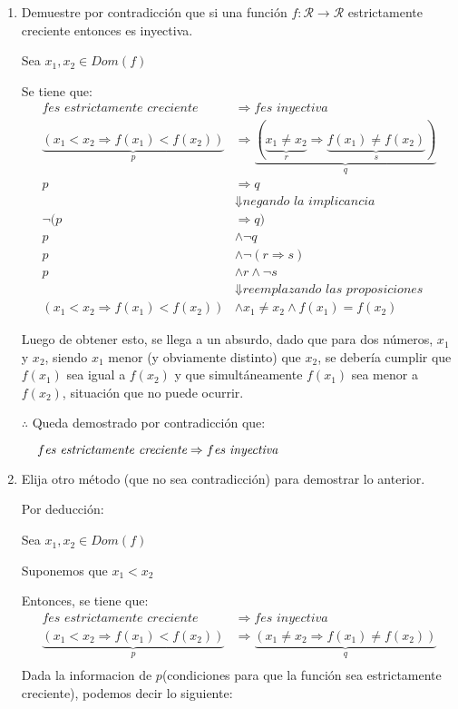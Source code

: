\documentclass[spanish, fleqn]{article}
\begin{document}
\begin{enumerate}
\item Demuestre por contradicción que si una función \(f: \mathcal{R} \rightarrow \mathcal{R}\) estrictamente creciente entonces es inyectiva.

Sea $x_1,x_2\in Dom(f)$

Se tiene que:
\begin{align*}
f \textit{es estrictamente creciente} &\Rightarrow f \textit{es inyectiva}\\
\underbrace{(x_1 < x_2 \Rightarrow f(x_1)< f(x_2))}_{p}&\Rightarrow  \underbrace{(\underbrace{x_1\neq x_2}_{r} \Rightarrow \underbrace{f(x_1)\neq f(x_2)}_{s})}_{q}\\
p &\Rightarrow q\\
&\Downarrow \textit{negando la implicancia}\\
\neg (p&\Rightarrow q)\\
p &\wedge \neg q \\
p &\wedge \neg (r \Rightarrow s)\\
p &\wedge r \wedge \neg s\\
&\Downarrow \textit{reemplazando las proposiciones}\\
(x_1 < x_2 \Rightarrow f(x_1)< f(x_2))&\wedge x_1\neq x_2 \wedge f(x_1)= f(x_2)
\end{align*}

Luego de obtener esto, se llega a un absurdo, dado que para dos números, $x_1$ y $x_2$, siendo $x_1$ menor (y obviamente distinto) que $x_2$, se debería cumplir que $f(x_1)$ sea igual a $f(x_2)$ y que simultáneamente $f(x_1)$ sea menor a $f(x_2)$, situación que no puede ocurrir.

$\therefore$ Queda demostrado por contradicción que:

$\hspace{0.4cm} f \textit{es estrictamente creciente} \Rightarrow f \textit{es inyectiva}$
 
\item Elija otro método  (que no sea contradicción) para demostrar lo anterior.

Por deducción:

Sea $x_1,x_2\in Dom(f)$

Suponemos que $x_1<x_2$

Entonces, se tiene que:
\begin{align*}
f \textit{es estrictamente creciente} &\Rightarrow f \textit{es inyectiva}\\
\underbrace{(x_1 < x_2 \Rightarrow f(x_1)< f(x_2))}_{p}&\Rightarrow \underbrace{(x_1\neq x_2\Rightarrow f(x_1)\neq f(x_2))}_{q}\\
\end{align*}
Dada la informacion de $p$(condiciones para que la función sea estrictamente creciente), podemos decir lo siguiente:


\end{enumerate}
\end{document}
